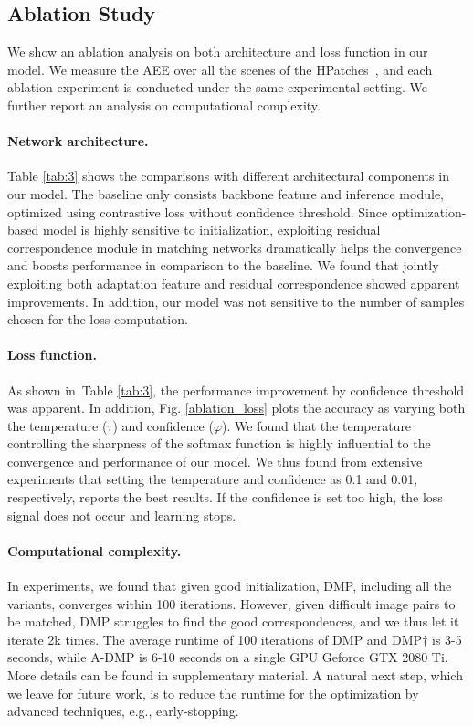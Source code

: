 \documentclass[10pt,twocolumn,letterpaper]{article}
\newcommand{\figref}[1]{Fig. \ref{#1}}
\newcommand{\tabref}[1]{Table \ref{#1}}
\begin{document}
\subsection{Ablation Study}\label{sec:4_5}
We show an ablation analysis on both architecture and loss function in our model. We measure the AEE over all the scenes of the HPatches~\cite{balntas2017hpatches}, and each ablation experiment is conducted under the same experimental setting. We further report an analysis on computational complexity. 
\vspace{-10pt}

\paragraph{Network architecture.}
\tabref{tab:3} shows the comparisons with different architectural components in our model. The baseline only consists backbone feature and inference module, optimized using contrastive loss without confidence threshold. Since optimization-based model is highly sensitive to initialization, exploiting residual correspondence module in matching networks dramatically helps the convergence and boosts performance in comparison to the baseline. We found that jointly exploiting both adaptation feature and residual correspondence showed apparent improvements. In addition, our model was not sensitive to the number of samples chosen for the loss computation. 
\vspace{-10pt}

\paragraph{Loss function.}
As shown in~\tabref{tab:3}, the performance improvement by confidence threshold was apparent. In addition, \figref{ablation_loss} plots the accuracy as varying both the temperature ($\tau$) and confidence ($\varphi$). We found that the temperature controlling the sharpness of the softmax function is highly influential to the convergence and performance of our model. We thus found from extensive experiments that setting the temperature and confidence as 0.1 and 0.01, respectively, reports the best results. If the confidence is set too high, the loss signal does not occur and learning stops.  
\vspace{-10pt}

\paragraph{Computational complexity.}
In experiments, we found that given good initialization, DMP, including all the variants, converges within 100 iterations. 
However, given difficult image pairs to be matched, DMP struggles to find the good correspondences, and we thus let it iterate 2k times. The average runtime of 100 iterations of DMP and DMP$\dagger$ is 3-5 seconds, while A-DMP is 6-10 seconds on a single GPU Geforce GTX 2080 Ti. More details can be found in supplementary material. A natural next step, which we leave for future work, is to reduce the runtime for the optimization by advanced techniques, e.g., early-stopping. 
\end{document}
